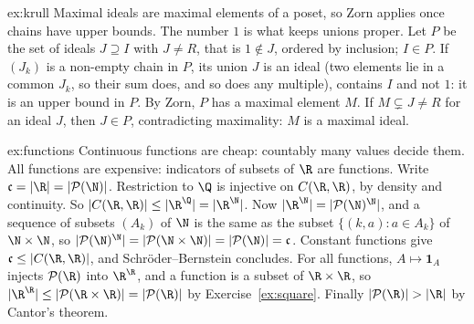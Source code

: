 \begin{solution}{ex:krull}
\idea Maximal ideals are maximal elements of a poset, so Zorn applies once chains have upper bounds. The number $1$ is what keeps unions
proper.
\writeup Let $P$ be the set of ideals $J\supseteq I$ with $J\ne R$, that is $1\notin J$, ordered by inclusion; $I\in P$. If $(J_k)$ is a non-empty chain in $P$,
its union $J$ is an ideal (two elements lie in a common $J_k$, so their sum does, and so does any multiple), contains $I$ and not $1$:
it is an upper bound in $P$. By Zorn, $P$ has a maximal element $M$. If $M\subsetneq J\ne R$ for an ideal $J$, then $J\in P$, contradicting maximality: $M$ is a
maximal ideal.
\end{solution}

\begin{solution}{ex:functions}
\idea Continuous functions are cheap: countably many values decide them. All functions are expensive: indicators of subsets of $\R$
are functions.
\writeup Write $\mathfrak c=|\R|=|\mathcal P(\N)|$. Restriction to $\Q$ is injective on $C(\R,\R)$, by density and continuity. So $|C(\R,\R)|\le|\R^\Q|=|\R^\N|$.
Now $|\R^\N|=|\mathcal P(\N)^\N|$, and a sequence of subsets $(A_k)$ of $\N$ is the same as the subset $\{(k,a):a\in A_k\}$ of $\N\times\N$, so
$|\mathcal P(\N)^\N|=|\mathcal P(\N\times\N)|=|\mathcal P(\N)|=\mathfrak c$. Constant functions give $\mathfrak c\le|C(\R,\R)|$, and Schr\"oder--Bernstein concludes. For all functions,
$A\mapsto\mathbf 1_A$ injects $\mathcal P(\R)$ into $\R^\R$, and a function is a subset of $\R\times\R$, so $|\R^\R|\le|\mathcal P(\R\times\R)|=|\mathcal P(\R)|$ by Exercise~\ref{ex:square}.
Finally $|\mathcal P(\R)|>|\R|$ by Cantor's theorem.
\end{solution}

